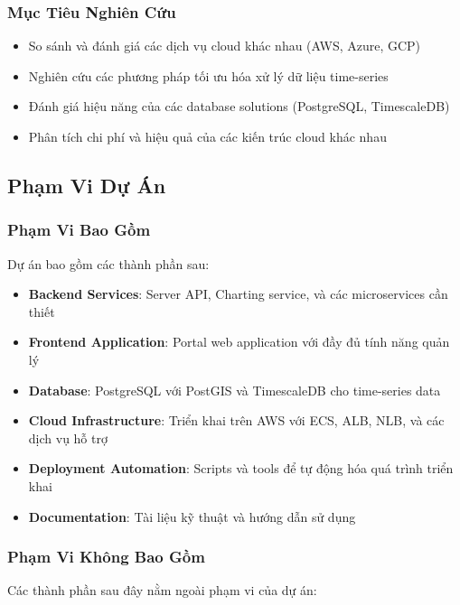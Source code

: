 \subsubsection{Mục Tiêu Nghiên Cứu}

\begin{itemize}
    \item So sánh và đánh giá các dịch vụ cloud khác nhau (AWS, Azure, GCP)
    \item Nghiên cứu các phương pháp tối ưu hóa xử lý dữ liệu time-series
    \item Đánh giá hiệu năng của các database solutions (PostgreSQL, TimescaleDB)
    \item Phân tích chi phí và hiệu quả của các kiến trúc cloud khác nhau
\end{itemize}

\subsection{Phạm Vi Dự Án}

\subsubsection{Phạm Vi Bao Gồm}

Dự án bao gồm các thành phần sau:

\begin{itemize}
    \item \textbf{Backend Services}: Server API, Charting service, và các microservices cần thiết
    \item \textbf{Frontend Application}: Portal web application với đầy đủ tính năng quản lý
    \item \textbf{Database}: PostgreSQL với PostGIS và TimescaleDB cho time-series data
    \item \textbf{Cloud Infrastructure}: Triển khai trên AWS với ECS, ALB, NLB, và các dịch vụ hỗ trợ
    \item \textbf{Deployment Automation}: Scripts và tools để tự động hóa quá trình triển khai
    \item \textbf{Documentation}: Tài liệu kỹ thuật và hướng dẫn sử dụng
\end{itemize}

\subsubsection{Phạm Vi Không Bao Gồm}

Các thành phần sau đây nằm ngoài phạm vi của dự án:

